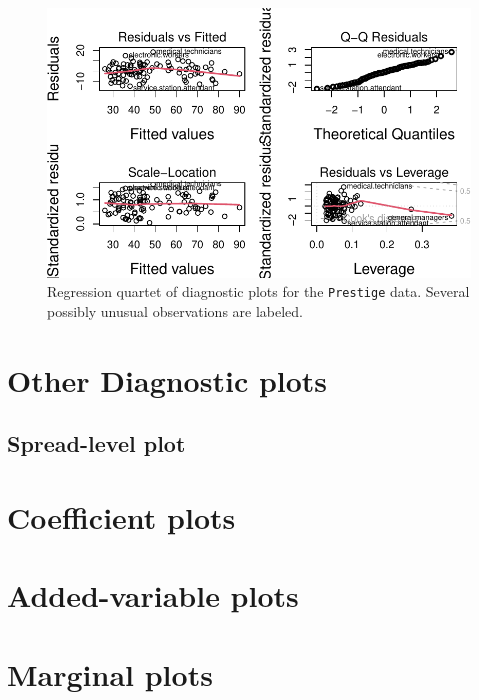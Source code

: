 \documentclass[
  letterpaper,
  10pt,
  krantz2]{krantz}
\begin{document}
\begin{figure}[H]

{\centering \includegraphics[width=1\textwidth,height=\textheight]{figs/fig-plot-prestige-mod-1.pdf}

}

\caption{\label{fig-plot-prestige-mod}Regression quartet of diagnostic
plots for the \texttt{Prestige} data. Several possibly unusual
observations are labeled.}

\end{figure}

\hypertarget{other-diagnostic-plots}{%
\section{Other Diagnostic plots}\label{other-diagnostic-plots}}

\hypertarget{spread-level-plot}{%
\subsection{Spread-level plot}\label{spread-level-plot}}

\hypertarget{coefficient-plots}{%
\section{Coefficient plots}\label{coefficient-plots}}

\hypertarget{added-variable-plots}{%
\section{Added-variable plots}\label{added-variable-plots}}

\hypertarget{marginal-plots}{%
\section{Marginal plots}\label{marginal-plots}}
\end{document}
